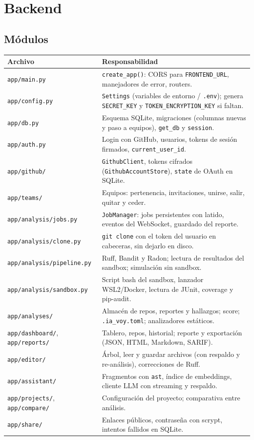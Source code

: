 \documentclass[11pt,a4paper]{article}
\newcommand{\code}[1]{\texttt{\small #1}}
\newcommand{\ruta}[1]{\texttt{\small\color{branddark}#1}}
\begin{document}
\section{Backend}

\subsection{Módulos}

\begin{longtable}{@{}>{\raggedright\arraybackslash}p{4.4cm}>{\raggedright\arraybackslash}p{10.8cm}@{}}
\toprule
\textbf{Archivo} & \textbf{Responsabilidad} \\
\midrule
\endhead
\ruta{app/main.py} & \code{create\_app()}: CORS para \code{FRONTEND\_URL}, manejadores de error, routers. \\
\ruta{app/config.py} & \code{Settings} (variables de entorno / \code{.env}); genera \code{SECRET\_KEY} y \code{TOKEN\_ENCRYPTION\_KEY} si faltan. \\
\ruta{app/db.py} & Esquema SQLite, migraciones (columnas nuevas y paso a equipos), \code{get\_db} y \code{session}. \\
\ruta{app/auth.py} & Login con GitHub, usuarios, tokens de sesión firmados, \code{current\_user\_id}. \\
\ruta{app/github/} & \code{GithubClient}, tokens cifrados (\code{GithubAccountStore}), \code{state} de OAuth en SQLite. \\
\ruta{app/teams/} & Equipos: pertenencia, invitaciones, unirse, salir, quitar y ceder. \\
\ruta{app/analysis/jobs.py} & \code{JobManager}: jobs persistentes con latido, eventos del WebSocket, guardado del reporte. \\
\ruta{app/analysis/clone.py} & \code{git clone} con el token del usuario en cabeceras, sin dejarlo en disco. \\
\ruta{app/analysis/pipeline.py} & Ruff, Bandit y Radon; lectura de resultados del sandbox; simulación sin sandbox. \\
\ruta{app/analysis/sandbox.py} & Script bash del sandbox, lanzador WSL2/Docker, lectura de JUnit, coverage y pip-audit. \\
\ruta{app/analyses/} & Almacén de repos, reportes y hallazgos; score; \code{.ia\_voy.toml}; analizadores estáticos. \\
\ruta{app/dashboard/}, \ruta{app/reports/} & Tablero, repos, historial; reporte y exportación (JSON, HTML, Markdown, SARIF). \\
\ruta{app/editor/} & Árbol, leer y guardar archivos (con respaldo y re-análisis), correcciones de Ruff. \\
\ruta{app/assistant/} & Fragmentos con \code{ast}, índice de embeddings, cliente LLM con streaming y respaldo. \\
\ruta{app/projects/}, \ruta{app/compare/} & Configuración del proyecto; comparativa entre análisis. \\
\ruta{app/share/} & Enlaces públicos, contraseña con scrypt, intentos fallidos en SQLite. \\
\bottomrule
\end{longtable}
\end{document}

